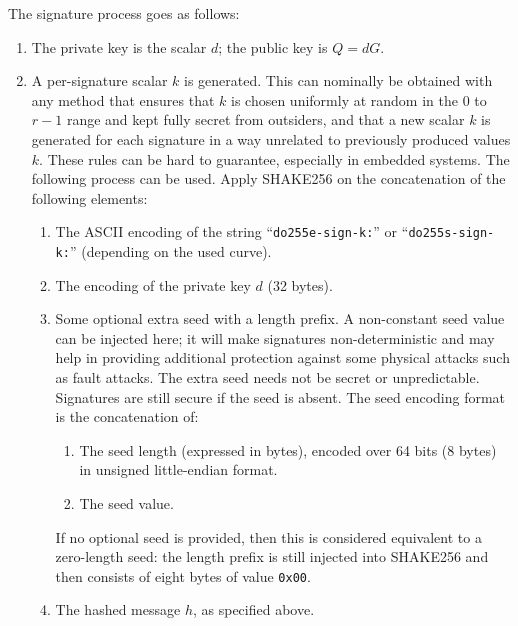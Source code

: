 \documentclass{llncs}
\begin{document}
The signature process goes as follows:
\begin{enumerate}

    \item The private key is the scalar $d$; the public key is $Q = dG$.

    \item A per-signature scalar $k$ is generated. This can nominally be
    obtained with any method that ensures that $k$ is chosen uniformly
    at random in the $0$ to $r-1$ range and kept fully secret from
    outsiders, and that a new scalar $k$ is generated for each signature
    in a way unrelated to previously produced values $k$. These rules
    can be hard to guarantee, especially in embedded systems. The
    following process can be used. Apply SHAKE256 on the concatenation
    of the following elements:
    \begin{enumerate}

        \item The ASCII encoding of the string ``\verb+do255e-sign-k:+''
        or ``\verb+do255s-sign-k:+'' (depending on the used curve).

        \item The encoding of the private key $d$ (32 bytes).

        \item Some optional extra seed with a length prefix. A
        non-constant seed value can be injected here; it will make
        signatures non-deterministic and may help in providing
        additional protection against some physical attacks such as
        fault attacks. The extra seed needs not be secret or
        unpredictable. Signatures are still secure if the seed is
        absent. The seed encoding format is the concatenation of:
        \begin{enumerate}
            \item The seed length (expressed in bytes), encoded
            over 64 bits (8 bytes) in unsigned little-endian format.
            \item The seed value.
        \end{enumerate}
        If no optional seed is provided, then this is considered
        equivalent to a zero-length seed: the length prefix is still
        injected into SHAKE256 and then consists of eight bytes of value
        \verb+0x00+.

        \item The hashed message $h$, as specified above.


\end{enumerate}
\end{enumerate}
\end{document}
